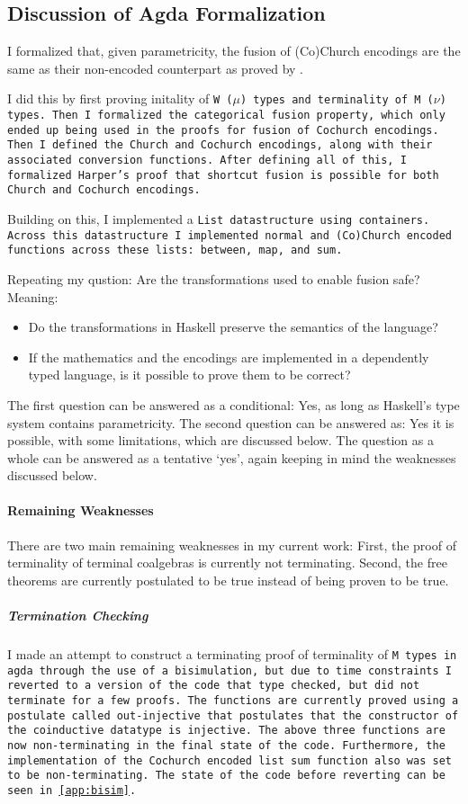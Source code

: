 
\subsection{Discussion of Agda Formalization}\label{sec:agda_form_disc}
I formalized that, given parametricity, the fusion of (Co)Church encodings are the same as their non-encoded counterpart as proved by \cite{Harper2011}.

I did this by first proving initality of \tt{W} ($\mu$) types and terminality of \tt{M} ($\nu$) types.
Then I formalized the categorical fusion property, which only ended up being used in the proofs for fusion of Cochurch encodings.
Then I defined the Church and Cochurch encodings, along with their associated conversion functions.
After defining all of this, I formalized Harper's proof that shortcut fusion is possible for both Church and Cochurch encodings.

Building on this, I implemented a \tt{List} datastructure using containers.
Across this datastructure I implemented normal and (Co)Church encoded functions across these lists: \tt{between}, \tt{map}, and \tt{sum}.

Repeating my qustion:
Are the transformations used to enable fusion safe? Meaning:
\begin{itemize}[noitemsep]
  \item Do the transformations in Haskell preserve the semantics of the language?
  \item If the mathematics and the encodings are implemented in a dependently typed language, is it possible to prove them to be correct?
\end{itemize}
The first question can be answered as a conditional: Yes, as long as Haskell's type system contains parametricity.
The second question can be answered as: Yes it is possible, with some limitations, which are discussed below.
The question as a whole can be answered as a tentative `yes', again keeping in mind the weaknesses discussed below.


\paragraph{Remaining Weaknesses}
There are two main remaining weaknesses in my current work:
First, the proof of terminality of terminal coalgebras is currently not terminating.
Second, the free theorems are currently postulated to be true instead of being proven to be true.

\subparagraph{Termination Checking}
I made an attempt to construct a terminating proof of terminality of \tt{M} types in agda through the use of a bisimulation, but due to time constraints I reverted to a version of the code that type checked, but did not terminate for a few proofs.
The functions are currently proved using a postulate called \tt{out-injective} that postulates that the constructor of the coinductive datatype is injective.
The above three functions are now non-terminating in the final state of the code.
Furthermore, the implementation of the Cochurch encoded list \tt{sum} function also was set to be non-terminating.
The state of the code before reverting can be seen in \autoref{app:bisim}.

